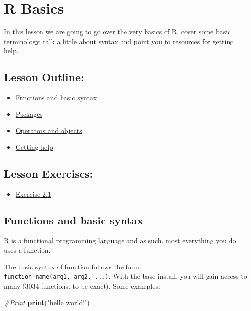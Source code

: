 \documentclass[]{article}
\title{}
\author{}
\date{}
\newenvironment{Shaded}{\begin{snugshade}}{\end{snugshade}}
\newcommand{\CommentTok}[1]{\textcolor[rgb]{0.56,0.35,0.01}{\textit{#1}}}
\newcommand{\KeywordTok}[1]{\textcolor[rgb]{0.13,0.29,0.53}{\textbf{#1}}}
\newcommand{\NormalTok}[1]{#1}
\newcommand{\StringTok}[1]{\textcolor[rgb]{0.31,0.60,0.02}{#1}}
\providecommand{\tightlist}{%
  \setlength{\itemsep}{0pt}\setlength{\parskip}{0pt}}
\begin{document}
\hypertarget{r-basics}{%
\section{R Basics}\label{r-basics}}

In this lesson we are going to go over the very basics of R, cover some
basic terminology, talk a little about syntax and point you to resources
for getting help.

\hypertarget{lesson-outline}{%
\subsection{Lesson Outline:}\label{lesson-outline}}

\begin{itemize}
\tightlist
\item
  \protect\hyperlink{functions-and-basic-syntax}{Functions and basic
  syntax}
\item
  \protect\hyperlink{packages}{Packages}
\item
  \protect\hyperlink{operators-and-objects}{Operators and objects}
\item
  \protect\hyperlink{getting-help}{Getting help}
\end{itemize}

\hypertarget{lesson-exercises}{%
\subsection{Lesson Exercises:}\label{lesson-exercises}}

\begin{itemize}
\tightlist
\item
  \protect\hyperlink{exercise-21}{Exercise 2.1}
\end{itemize}

\hypertarget{functions-and-basic-syntax}{%
\subsection{Functions and basic
syntax}\label{functions-and-basic-syntax}}

R is a functional programming language and as such, most everything you
do uses a function.

The basic syntax of function follows the form:
\texttt{function\_name(arg1,\ arg2,\ ...)}. With the base install, you
will gain access to many (3034 functions, to be exact). Some examples:

\begin{Shaded}
\begin{Highlighting}[]
\CommentTok{#Print}
\KeywordTok{print}\NormalTok{(}\StringTok{"hello world!"}\NormalTok{)}
\end{Highlighting}
\end{Shaded}
\end{document}
